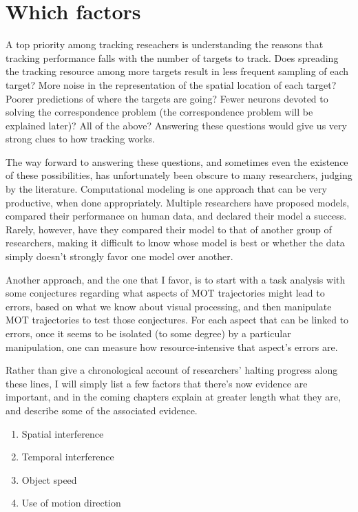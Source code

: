 \documentclass[
]{book}
\providecommand{\tightlist}{%
  \setlength{\itemsep}{0pt}\setlength{\parskip}{0pt}}
\begin{document}
\hypertarget{which-factors}{%
\section{Which factors}\label{which-factors}}

A top priority among tracking reseachers is understanding the reasons that tracking performance falls with the number of targets to track. Does spreading the tracking resource among more targets result in less frequent sampling of each target? More noise in the representation of the spatial location of each target? Poorer predictions of where the targets are going? Fewer neurons devoted to solving the correspondence problem (the correspondence problem will be explained later)? All of the above? Answering these questions would give us very strong clues to how tracking works.

The way forward to answering these questions, and sometimes even the existence of these possibilities, has unfortunately been obscure to many researchers, judging by the literature. Computational modeling is one approach that can be very productive, when done appropriately. Multiple researchers have proposed models, compared their performance on human data, and declared their model a success. Rarely, however, have they compared their model to that of another group of researchers, making it difficult to know whose model is best or whether the data simply doesn't strongly favor one model over another.

Another approach, and the one that I favor, is to start with a task analysis with some conjectures regarding what aspects of MOT trajectories might lead to errors, based on what we know about visual processing, and then manipulate MOT trajectories to test those conjectures. For each aspect that can be linked to errors, once it seems to be isolated (to some degree) by a particular manipulation, one can measure how resource-intensive that aspect's errors are.

Rather than give a chronological account of researchers' halting progress along these lines, I will simply list a few factors that there's now evidence are important, and in the coming chapters explain at greater length what they are, and describe some of the associated evidence.

\begin{enumerate}
\def\labelenumi{\arabic{enumi}.}
\tightlist
\item
  Spatial interference
\item
  Temporal interference
\item
  Object speed
\item
  Use of motion direction
\end{enumerate}
\end{document}
